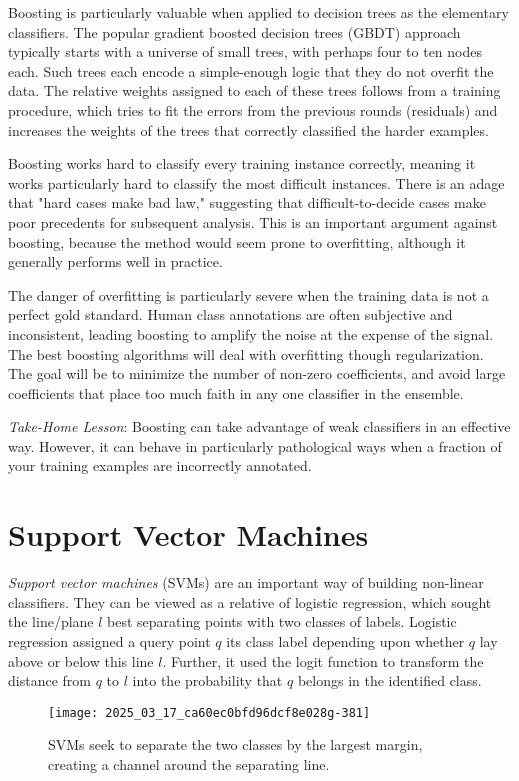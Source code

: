 \documentclass[10pt]{article}
\begin{document}
\begin{enumerate}
Boosting is particularly valuable when applied to decision trees as the elementary classifiers. The popular gradient boosted decision trees (GBDT) approach typically starts with a universe of small trees, with perhaps four to ten nodes each. Such trees each encode a simple-enough logic that they do not overfit the data. The relative weights assigned to each of these trees follows from a training procedure, which tries to fit the errors from the previous rounds (residuals) and increases the weights of the trees that correctly classified the harder examples.

Boosting works hard to classify every training instance correctly, meaning it works particularly hard to classify the most difficult instances. There is an adage that "hard cases make bad law," suggesting that difficult-to-decide cases make poor precedents for subsequent analysis. This is an important argument against boosting, because the method would seem prone to overfitting, although it generally performs well in practice.

The danger of overfitting is particularly severe when the training data is not a perfect gold standard. Human class annotations are often subjective and inconsistent, leading boosting to amplify the noise at the expense of the signal. The best boosting algorithms will deal with overfitting though regularization. The goal will be to minimize the number of non-zero coefficients, and avoid large coefficients that place too much faith in any one classifier in the ensemble.

\textit{Take-Home Lesson}: Boosting can take advantage of weak classifiers in an effective way. However, it can behave in particularly pathological ways when a fraction of your training examples are incorrectly annotated.

\section*{Support Vector Machines}
\textit{Support vector machines} (SVMs) are an important way of building non-linear classifiers. They can be viewed as a relative of logistic regression, which sought the line/plane $l$ best separating points with two classes of labels. Logistic regression assigned a query point $q$ its class label depending upon whether $q$ lay above or below this line $l$. Further, it used the logit function to transform the distance from $q$ to $l$ into the probability that $q$ belongs in the identified class.

\begin{figure}[h!]
\centering
\texttt{[image: 2025\_03\_17\_ca60ec0bfd96dcf8e028g-381]}
\caption{SVMs seek to separate the two classes by the largest margin, creating a channel around the separating line.}
\end{figure}


\end{enumerate}
\end{document}
